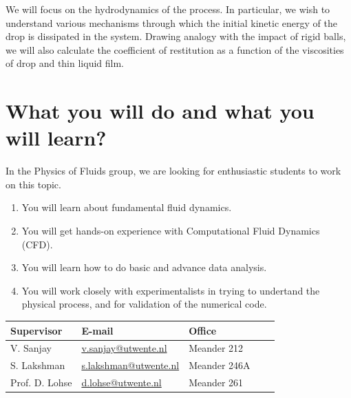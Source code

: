 \documentclass[a4paper,10pt]{article}
\begin{document}
We will focus on the hydrodynamics of the process. In particular, we wish to understand various mechanisms through which the initial kinetic energy of the drop is dissipated in the system. Drawing analogy with the impact of rigid balls, we will also calculate the coefficient of restitution as a function of the viscosities of drop and thin liquid film.

\section*{What you will do and what you will learn?}
In the Physics of Fluids group, we are looking for enthusiastic students to work on this topic.
\begin{enumerate}
	\itemsep0em
	\item You will learn about fundamental fluid dynamics.
	\item You will get hands-on experience with Computational Fluid Dynamics (CFD).
	\item You will learn how to do basic and advance data analysis.
	\item You will work closely with experimentalists in trying to undertand the physical process, and for validation of the numerical code.
\end{enumerate}

\begin{center}
	\begin{tabular}{|l|l|l|l|l|}
		\hline \textbf{Supervisor} & \textbf{E-mail} & \textbf{Office} \\
		\hline V. Sanjay & \href{mailto:v.sanjay@utwente.nl}{v.sanjay@utwente.nl} & Meander 212\\
		\hline S. Lakshman & \href{mailto:s.lakshman@utwente.nl}{s.lakshman@utwente.nl} & Meander 246A\\
		\hline Prof. D. Lohse & \href{mailto:d.lohse@utwente.nl}{d.lohse@utwente.nl} & Meander 261\\
		\hline
	\end{tabular}
\end{center}
\end{document}
